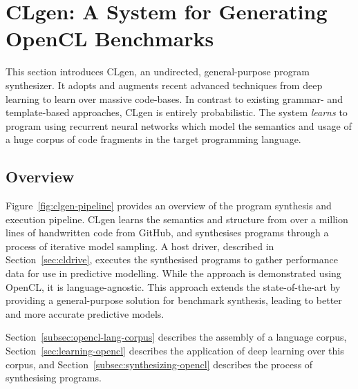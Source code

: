 \section{CLgen: A System for Generating OpenCL Benchmarks}%
\label{sec:clgen}

This section introduces CLgen, an undirected, general-purpose program synthesizer. It adopts and augments recent advanced techniques from deep learning to learn over massive code-bases. In contrast to existing grammar- and template-based approaches, CLgen is entirely probabilistic. The system \emph{learns} to program using recurrent neural networks which model the semantics and usage of a huge corpus of code fragments in the target programming language.

\subsection{Overview}

Figure~\ref{fig:clgen-pipeline} provides an overview of the program synthesis and execution pipeline. CLgen learns the semantics and structure from over a million lines of handwritten code from GitHub, and synthesises programs through a process of iterative model sampling. A host driver, described in Section~\ref{sec:cldrive}, executes the synthesised programs to gather performance data for use in predictive modelling. While the approach is demonstrated using OpenCL, it is language-agnostic. This approach extends the state-of-the-art by providing a general-purpose solution for benchmark synthesis, leading to better and more accurate predictive models.

Section~\ref{subsec:opencl-lang-corpus} describes the assembly of a language corpus, Section~\ref{sec:learning-opencl} describes the application of deep learning over this corpus, and Section~\ref{subsec:synthesizing-opencl} describes the process of synthesising programs.

